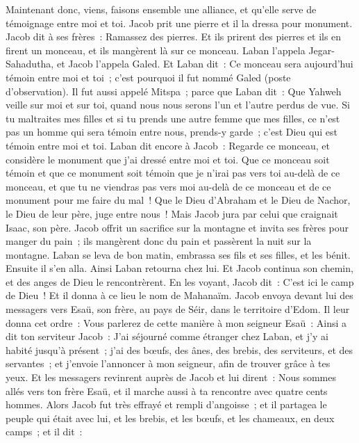 \begin{multicols}{2}
Maintenant donc, viens, faisons ensemble une alliance, et qu'elle serve de témoignage entre moi et toi.
Jacob prit une pierre et il la dressa pour monument.
Jacob dit à ses frères~: Ramassez des pierres. Et ils prirent des pierres et ils en firent un monceau, et ils mangèrent là sur ce monceau.
Laban l'appela Jegar-Sahadutha, et Jacob l'appela Galed.
Et Laban dit~: Ce monceau sera aujourd'hui témoin entre moi et toi~; c'est pourquoi il fut nommé Galed (poste d'observation).
Il fut aussi appelé Mitspa~; parce que Laban dit~: Que Yahweh veille sur moi et sur toi, quand nous nous serons l'un et l'autre perdus de vue.
Si tu maltraites mes filles et si tu prends une autre femme que mes filles, ce n'est pas un homme qui sera témoin entre nous, prends-y garde~; c'est Dieu qui est témoin entre moi et toi.
Laban dit encore à Jacob~: Regarde ce monceau, et considère le monument que j'ai dressé entre moi et toi.
Que ce monceau soit témoin et que ce monument soit témoin que je n'irai pas vers toi au-delà de ce monceau, et que tu ne viendras pas vers moi au-delà de ce monceau et de ce monument pour me faire du mal~!
Que le Dieu d'Abraham et le Dieu de Nachor, le Dieu de leur père, juge entre nous~! Mais Jacob jura par celui que craignait Isaac, son père.
Jacob offrit un sacrifice sur la montagne et invita ses frères pour manger du pain~; ils mangèrent donc du pain et passèrent la nuit sur la montagne.
Laban se leva de bon matin, embrassa ses fils et ses filles, et les bénit. Ensuite il s'en alla. Ainsi Laban retourna chez lui.
\VerseOne{}Et Jacob continua son chemin, et des anges de Dieu le rencontrèrent.
En les voyant, Jacob dit~: C'est ici le camp de Dieu~! Et il donna à ce lieu le nom de Mahanaïm.
Jacob envoya devant lui des messagers vers Esaü, son frère, au pays de Séir, dans le territoire d'Edom.
Il leur donna cet ordre~: Vous parlerez de cette manière à mon seigneur Esaü~: Ainsi a dit ton serviteur Jacob~: J'ai séjourné comme étranger chez Laban, et j'y ai habité jusqu'à présent~;
j'ai des bœufs, des ânes, des brebis, des serviteurs, et des servantes~; et j'envoie l'annoncer à mon seigneur, afin de trouver grâce à tes yeux.
Et les messagers revinrent auprès de Jacob et lui dirent~: Nous sommes allés vers ton frère Esaü, et il marche aussi à ta rencontre avec quatre cents hommes.
Alors Jacob fut très effrayé et rempli d'angoisse~; et il partagea le peuple qui était avec lui, et les brebis, et les bœufs, et les chameaux, en deux camps~; et il dit~:

\end{multicols}
